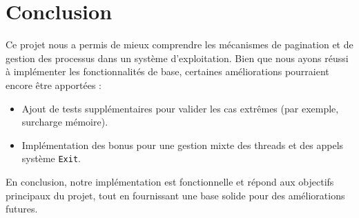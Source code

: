 \documentclass[a4paper,11pt]{article}
\begin{document}
\section{Conclusion}
Ce projet nous a permis de mieux comprendre les mécanismes de pagination et de gestion des processus dans un système d'exploitation. Bien que nous ayons réussi à implémenter les fonctionnalités de base, certaines améliorations pourraient encore être apportées :
\begin{itemize}
    \item Ajout de tests supplémentaires pour valider les cas extrêmes (par exemple, surcharge mémoire).
    \item Implémentation des bonus pour une gestion mixte des threads et des appels système \texttt{Exit}.
\end{itemize}
En conclusion, notre implémentation est fonctionnelle et répond aux objectifs principaux du projet, tout en fournissant une base solide pour des améliorations futures.
\end{document}
